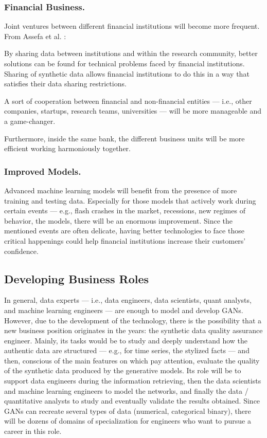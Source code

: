 \documentclass[runningheads]{llncs}
\begin{document}
\subsubsection{Financial Business.}
Joint ventures between different financial institutions will become more frequent. From Assefa et al. \cite{AMEX}:

\begin{displayquote}
By sharing data between institutions and within the research community, better solutions can be found for technical problems faced by financial institutions. Sharing of synthetic data allows financial institutions to do this in a way that satisfies their data sharing restrictions. 
\end{displayquote}

A sort of cooperation between financial and non-financial entities — i.e., other companies, startups, research teams, universities — will be more manageable and a game-changer.

Furthermore, inside the same bank, the different business units will be more efficient working harmoniously together.

\subsubsection{Improved Models.}
Advanced machine learning models will benefit from the presence of more training and testing data. Especially for those models that actively work during certain events — e.g., flash crashes in the market, recessions, new regimes of behavior, the models, there will be an enormous improvement. Since the mentioned events are often delicate, having better technologies to face those critical happenings could help financial institutions increase their customers' confidence.

\subsection{Developing Business Roles}
In general, data experts — i.e., data engineers, data scientists, quant analysts, and machine learning engineers — are enough to model and develop GANs. However, due to the development of the technology, there is the possibility that a new business position originates in the years: the synthetic data quality assurance engineer. Mainly, its tasks would be to study and deeply understand how the authentic data are structured — e.g., for time series, the stylized facts — and then, conscious of the main features on which pay attention, evaluate the quality of the synthetic data produced by the generative models. Its role will be to support data engineers during the information retrieving, then the data scientists and machine learning engineers to model the networks, and finally the data / quantitative analysts to study and eventually validate the results obtained. Since GANs can recreate several types of data (numerical, categorical binary), there will be dozens of domains of specialization for engineers who want to pursue a career in this role.
\end{document}
